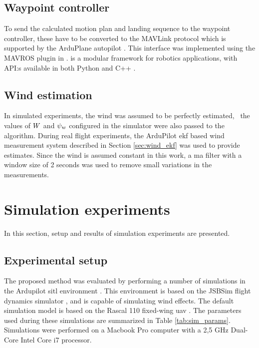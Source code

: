 \subsection{Waypoint controller}
To send the calculated motion plan and landing sequence to the waypoint controller, these have to be converted to the 
MAVLink protocol which is supported by the ArduPlane autopilot \cite{mavlink}. This interface was implemented using the MAVROS 
plugin in  \cite{mavros}.  is a modular framework for robotics applications, with API:s available in both Python and C++ \cite{ros}.

\subsection{Wind estimation}
In simulated experiments, the wind was assumed to be perfectly estimated, \ie\, the values of $W$ and $\psi_w$ configured in the simulator were also passed to the algorithm. 
During real flight experiments, the ArduPilot \ac{ekf} based wind measurement system described in Section \ref{sec:wind_ekf} was used to provide estimates. Since the wind is assumed constant in this work, a \ac{ma} filter with a 
window size of 2 seconds was used to remove small variations in the measurements.

\section{Simulation experiments}
In this section, setup and results of simulation experiments are presented.
\subsection{Experimental setup}
The proposed method was evaluated by performing a number of simulations in the Ardupilot \ac{sitl} environment \cite{ardupilot_sitl}. This environment is based on the 
JSBSim flight dynamics simulator \cite{jsbsim}, and is capable of simulating wind effects. The default simulation model is based on the Rascal 110 fixed-wing \ac{uav} \cite{rascal}.
The parameters used during these simulations are summarized in Table \ref{tab:sim_params}. Simulations were performed on a Macbook Pro computer with a 2,5 GHz Dual-Core Intel Core i7 processor.

